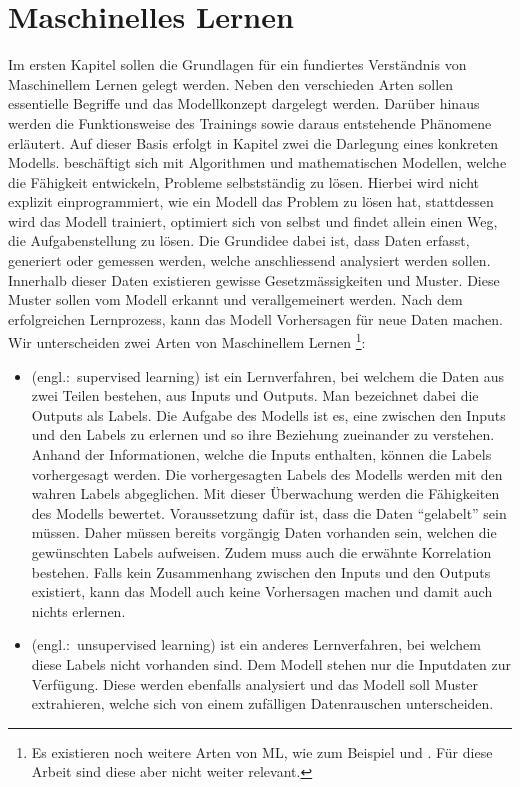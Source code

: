\chapter{Maschinelles Lernen}

Im ersten Kapitel sollen die Grundlagen für ein fundiertes Verständnis
von Maschinellem Lernen gelegt werden. Neben den verschieden Arten sollen
essentielle Begriffe und das Modellkonzept dargelegt werden. Darüber hinaus werden
die Funktionsweise des Trainings sowie daraus entstehende Phänomene erläutert.
Auf dieser Basis erfolgt in Kapitel zwei die Darlegung eines konkreten Modells.
\para{}
\bigskip
{} beschäftigt sich mit Algorithmen und
mathematischen Modellen, welche die Fähigkeit entwickeln, Probleme selbstständig
zu lösen.
Hierbei wird nicht explizit einprogrammiert, wie ein Modell das Problem zu lösen
hat, stattdessen wird das Modell trainiert, optimiert sich von selbst und findet allein
einen Weg, die Aufgabenstellung zu lösen.
Die Grundidee dabei ist, dass Daten erfasst, generiert oder gemessen werden,
welche anschliessend analysiert werden sollen.
Innerhalb dieser Daten existieren gewisse
Gesetzmässigkeiten und Muster. Diese Muster sollen vom Modell
erkannt und verallgemeinert werden. Nach dem erfolgreichen Lernprozess,
kann das Modell Vorhersagen für neue Daten machen.
\para{}
Wir unterscheiden zwei Arten von Maschinellem Lernen%
\footnote{
  Es existieren noch weitere Arten von ML, wie zum Beispiel
   und
  . Für diese Arbeit sind diese aber nicht
  weiter relevant.
}:
\begin{itemize}
\item{
     (engl.:\ supervised learning) ist ein
    Lernverfahren, bei welchem die Daten aus zwei Teilen bestehen, aus Inputs und
    Outputs. Man bezeichnet dabei die Outputs als Labels. Die Aufgabe des Modells
    ist es, eine  zwischen den Inputs und den Labels zu
    erlernen und so ihre Beziehung zueinander zu verstehen.
    Anhand der Informationen, welche die Inputs enthalten,
    können die Labels vorhergesagt werden. Die vorhergesagten Labels des Modells
    werden mit den wahren Labels abgeglichen. Mit dieser Überwachung werden die
    Fähigkeiten des Modells bewertet.
    \para{}
    Voraussetzung dafür ist, dass die Daten ``gelabelt'' sein müssen.
    Daher müssen bereits vorgängig Daten vorhanden sein, welchen die gewünschten
    Labels aufweisen. Zudem muss auch die erwähnte Korrelation bestehen. Falls
    kein Zusammenhang zwischen den Inputs und den Outputs existiert, kann das
    Modell auch keine Vorhersagen machen und damit auch nichts erlernen.
  }
\item{
     (engl.:\ unsupervised learning) ist ein anderes
    Lernverfahren, bei welchem diese Labels nicht vorhanden sind. Dem
    Modell stehen nur die Inputdaten zur Verfügung. Diese werden ebenfalls analysiert
    und das Modell soll Muster extrahieren, welche sich von einem
    zufälligen Datenrauschen unterscheiden.
  }
\end{itemize}

